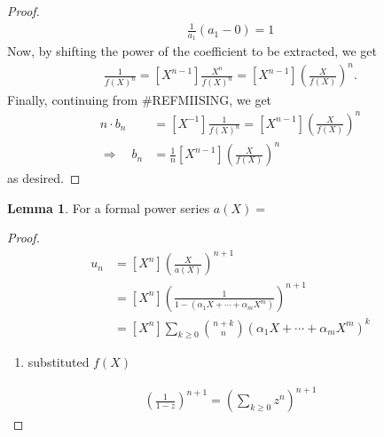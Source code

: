 \documentclass[a4paper]{article}
\theoremstyle{definition}
\newtheorem{lemma}[definition]{Lemma}
\begin{document}
\begin{proof}
    \begin{align}
        \frac{1}{a_1} \left(a_1 - 0\right) = 1
    \end{align}
    Now, by shifting the power of the coefficient to be extracted, we get
    \begin{align}
        [X^{-1}] \frac{1}{f(X)^n} = [X^{n-1}] \frac{X^n}{f(X)^n} = [X^{n-1}] \left( \frac{X}{f(X)} \right)^n \text{.}
    \end{align}
    Finally, continuing from \#REFMIISING, we get
    \begin{align}
        n \cdot b_n &= [X^{-1}] \frac{1}{f(X)^n} = [X^{n-1}] \left( \frac{X}{f(X)} \right)^n \\
        \Rightarrow \quad b_n &= \frac{1}{n} [X^{n-1}] \left( \frac{X}{f(X)} \right)^n
    \end{align}
    as desired.
\end{proof}
\begin{lemma}
    For a formal power series \(a(X) =\)
\end{lemma}
\begin{proof}
    \begin{align}
        u_n &= [X^n] \left(\frac{X}{a(X)} \right)^{n+1} \\
        &= [X^n] \left(\frac{1}{1 - (\alpha_1 X + \cdots + \alpha_m X^m)}\right)^{n+1} \\
        &= [X^n] \sum_{k \geq 0} \binom{n+k}{n} \left(\alpha_1 X + \cdots + \alpha_m X^m \right)^k
    \end{align}
    \begin{enumerate}
        \item substituted \(f(X)\)
    \end{enumerate}
    \begin{align}
        \left(\frac{1}{1 - z}\right)^{n + 1} = \left(\sum_{k \geq 0} z^n \right)^{n+1}
    \end{align}
\end{proof}
\end{document}
